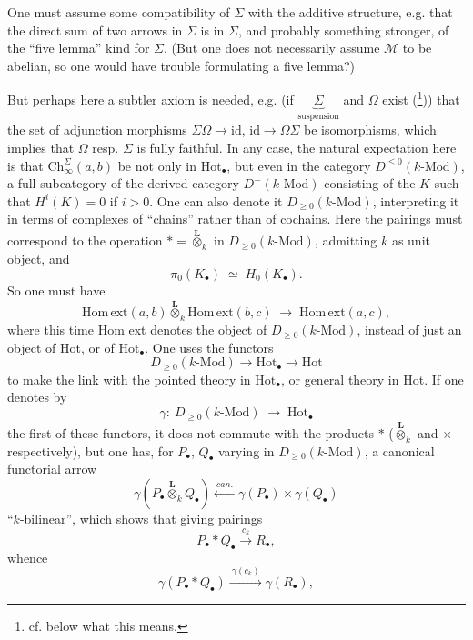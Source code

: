 \documentclass[11pt]{article}
\newcommand{\printedpage}[1]{\marginpar{\footnotesize p.~#1}}
\newcommand{\msp}[1]{\marginpar{\footnotesize [#1]}}
\newcommand{\M}{\mathcal{M}}
\newcommand{\Hot}{\mathrm{Hot}}
\newcommand{\Ch}{\mathrm{Ch}}
\newcommand{\Homext}{\mathrm{Hom\,ext}}
\newcommand{\Lotimes}{\overset{\mathbf{L}}{\otimes}}
\begin{document}
One must assume some compatibility of $\Sigma$ with the additive structure, e.g. that the direct sum of two arrows in $\Sigma$ is in $\Sigma$, and probably something stronger, of the ``five lemma'' kind for $\Sigma$. (But one does not necessarily assume $\M$ to be abelian, so one would have trouble formulating a five lemma?) %

\msp{page 19}

But perhaps here a subtler axiom is needed, e.g. (if $\underbrace{\Sigma}_{\text{suspension}}$ and $\Omega$ exist (\footnote[7]{cf. below what this means.})) that the set of adjunction morphisms $\Sigma\Omega \longrightarrow \mathrm{id}$, $\mathrm{id} \longrightarrow \Omega\Sigma$ be isomorphisms, which implies that $\Omega$ resp. $\Sigma$ is fully faithful. In any case, the natural expectation here is that $\Ch^{\Sigma}_{\infty}(a,b)$ be not only in $\Hot_{\bullet}$, but even in the category $D^{\leq 0}(k\text{-Mod})$, a full subcategory of the derived category $D^{-}(k\text{-Mod})$ consisting of the $K$ such that $H^{i}(K) = 0$ if $i > 0$. One can also denote it $D_{\geq 0}(k\text{-Mod})$, interpreting it in
\printedpage{12}
terms of complexes of ``chains'' rather than of cochains. Here the pairings must correspond to the operation $* = \Lotimes_k$ in $D_{\geq 0}(k\text{-Mod})$, admitting $k$ as unit object, and
\[
\pi_0(K_{\bullet}) \;\simeq\; H_0(K_{\bullet}).
\]
So one must have
\[
\Homext(a,b) \Lotimes_k \Homext(b,c) \;\longrightarrow\; \Homext(a,c),
\]
where this time Hom ext denotes the object of $D_{\geq 0}(k\text{-Mod})$, instead of just an object of Hot, or of $\Hot_{\bullet}$. One uses the functors
\[
D_{\geq 0}(k\text{-Mod}) \longrightarrow \Hot_{\bullet} \longrightarrow \Hot
\]
\msp{page 20}
to make the link with the pointed theory in $\Hot_{\bullet}$, or general theory in Hot. If one denotes by
\[
\gamma :\ D_{\geq 0}(k\text{-Mod}) \;\longrightarrow\; \Hot_{\bullet}
\]
the first of these functors, it does not commute with the products $*$ ($\Lotimes_k$ and $\times$ respectively), but one has, for $P_{\bullet}$, $Q_{\bullet}$ varying in $D_{\geq 0}(k\text{-Mod})$, a canonical functorial arrow %
\[
\gamma(P_{\bullet} \Lotimes_k Q_{\bullet}) \xleftarrow{\ \mathit{can.}\ } \gamma(P_{\bullet})\times\gamma(Q_{\bullet})
\]
``$k$-bilinear'', which shows that giving pairings
\[
P_{\bullet} * Q_{\bullet} \xrightarrow{\ c_k\ } R_{\bullet},
\]
whence
\[
\gamma(P_{\bullet} * Q_{\bullet}) \xrightarrow{\ \gamma(c_k)\ } \gamma(R_{\bullet}), \tag*{$(*)$}
\]
\end{document}
